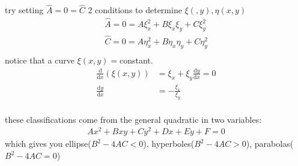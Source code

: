 \documentclass{article}
\begin{document}
try setting $\hat{A}=0=\hat{C}$ 2 conditions to determine $\xi(,y),\eta(x,y)$
\begin{align*}
  \hat{A}=0=A\xi_x^2+B\xi_x\xi_y+C\xi_y^2\\
  \hat{C}=0=A\eta_x^2+B\eta_x\eta_y+C\eta_y^2\\
\end{align*}
notice that a curve $\xi(x,y)=$constant.
\begin{align*}
  \frac{\mathrm{d}}{\mathrm{d}x}(\xi(x,y))&=\xi_x+\xi_y\frac{\mathrm{d}y}{\mathrm{d}x}=0\\
  \frac{\mathrm{d}y}{\mathrm{d}x}&=-\frac{\xi_x}{\xi_y}\\
\end{align*}

these classifications come from the general quadratic in two variables:
\begin{align*}
  Ax^2+Bxy+Cy^2+Dx+Ey+F=0
\end{align*}
which gives you ellipse($B^2-4AC<0$), hyperboles($B^2-4AC>0$), parabolas($B^2-4AC=0$)
\end{document}
